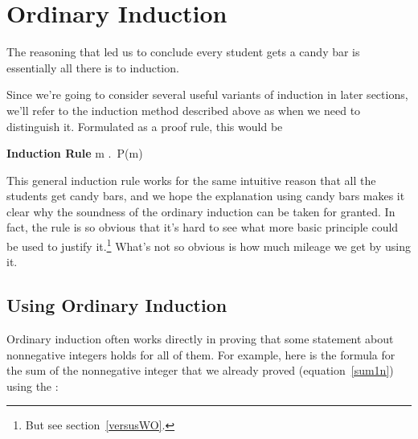 \section{Ordinary Induction}

The reasoning that led us to conclude every student gets a candy bar is 
essentially all there is to induction.
\iffalse
So our claim that all the Professor's students get a candy bar was simply
an application of the Induction Rule with $P(n)$ defined to be the
predicate, ``student $n$ gets a candy bar.''
\fi

Since we're going to consider several useful variants of induction in
later sections, we'll refer to the induction method described above as
 when we need to distinguish it.  Formulated as 
a proof rule, this would be
\begin{rul*} \textbf{Induction Rule}
{\forall m \in \naturals.\, P(m)}
\end{rul*}

This general induction rule works for the same intuitive reason that all
the students get candy bars, and we hope the explanation using candy bars
makes it clear why the soundness of the ordinary induction can be taken
for granted.  In fact, the rule is so obvious that it's hard to see what
more basic principle could be used to justify it.\footnote{But see
section~\ref{versusWO}.}  What's not so obvious is how much mileage 
we get by using it.

\subsection{Using Ordinary Induction}

Ordinary induction often works directly in proving that some statement
about nonnegative integers holds for all of them.  For example, here is
the formula for the sum of the nonnegative integer that we already proved
(equation~\eqref{sum1n}) using the :

